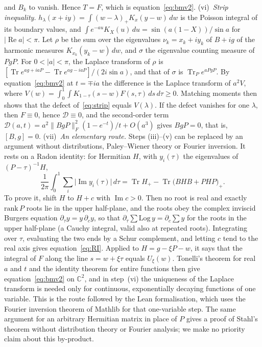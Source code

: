 \documentclass[11pt]{article}
\newcommand{\Tr}{\operatorname{Tr}}
\newcommand{\C}{\mathbb{C}}
\renewcommand{\Re}{\operatorname{Re}}
\renewcommand{\Im}{\operatorname{Im}}
\begin{document}
and $B_k$ to vanish. Hence $T=F$, which is equation~\eqref{eq:bmv2}.
(vi)~\emph{Strip inequality.} $h_\lambda(x+iy)=\int(w-\lambda)_+K_x(y-w)\,dw$ is the Poisson integral of its boundary
values, and $\int e^{-au}K_X(u)\,du=\sin(a(1-X))/\sin a$ for $|\Re a|<\pi$. Let $\rho$ be the sum over the eigenvalues
$\nu_k=x_k+iy_k$ of $B+ig$ of the harmonic measures $K_{x_k}(y_k-w)\,dw$, and $\sigma$ the eigenvalue counting measure
of $PgP$. For $0<|a|<\pi$, the Laplace transform of $\rho$ is $[\Tr e^{ag+iaP}-\Tr e^{ag-iaP}]/(2i\sin a)$, and that
of $\sigma$ is $\Tr_Pe^{aPgP}$. By equation~\eqref{eq:bmv2} at $t=\mp ia$ the difference is the Laplace transform of
$a^2V$, where $V(w)=\int_0^1\!\int K_{1-\tau}(s-w)F(s,\tau)\,ds\,d\tau\ge0$. Matching moments then shows that the
defect of~\eqref{eq:strip} equals $V(\lambda)$. If the defect vanishes for one $\lambda$, then $F\equiv0$, hence
$\mathcal{D}\equiv0$, and the second-order term $\mathcal{D}(a,t)=a^2\|BgP\|_F^2(1-e^{-t})/t+O(a^3)$ gives $BgP=0$,
that is, $[B,g]=0$.
(vii)~\emph{An elementary route.} Steps (iii)--(v) can be replaced by an argument without distributions, Paley--Wiener
theory or Fourier inversion. It rests on a Radon identity: for Hermitian $H$, with $y_i(\tau)$ the eigenvalues of
$(P-\tau)^{-1}H$,
\begin{equation}\label{eq:RI}
\frac1{2\pi}\int_0^1\sum_i\bigl|\Im y_i(\tau)\bigr|\,d\tau=\Tr H_+-\Tr\bigl(BHB+PHP\bigr)_+ .
\end{equation}
To prove it, shift $H$ to $H+c$ with $\Im c>0$. Then no root is real and exactly $\mathrm{rank}\,P$ roots lie in the
upper half-plane, and the roots obey the complex inviscid Burgers equation $\partial_\tau y=y\,\partial_cy$, so that
$\partial_\tau\sum\mathrm{Log}\,y=\partial_c\sum y$ for the roots in the upper half-plane (a Cauchy integral, valid also
at repeated roots). Integrating over $\tau$, evaluating the two ends by a Schur complement, and letting $c$ tend to the
real axis gives equation~\eqref{eq:RI}. Applied to $H=g-\xi P-w$, it says that the integral of $F$ along the line
$s=w+\xi\tau$ equals $U_\xi(w)$. Tonelli's theorem for real $a$ and $t$ and the identity theorem for entire functions
then give equation~\eqref{eq:bmv2} on $\C^2$, and in step~(vi) the uniqueness of the Laplace transform is needed only for
continuous, exponentially decaying functions of one variable. This is the route followed by the Lean formalisation,
which uses the Fourier inversion theorem of Mathlib for that one-variable step. The same argument for an arbitrary
Hermitian matrix in place of $P$ gives a proof of Stahl's theorem\cite{Stahl2013} without distribution theory or Fourier
analysis; we make no priority claim about this by-product.
\end{document}
